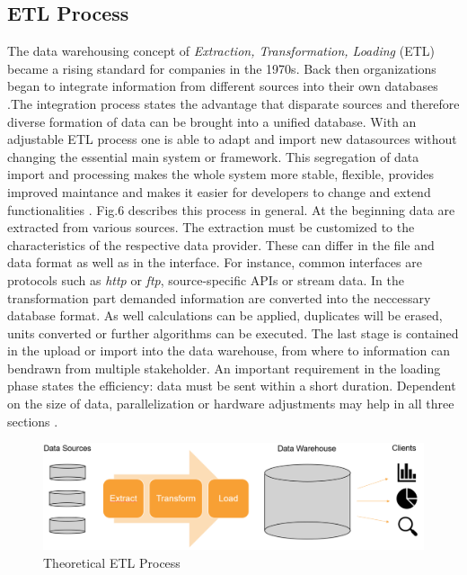 \documentclass[conference, 11pt]{IEEEtran}
\begin{document}
\subsection{ETL Process}
The data warehousing concept of \textit{Extraction, Transformation, Loading} (ETL) became a rising standard for companies in the 1970s. Back then organizations began to integrate information from different sources into their own databases \cite{carl1}.\break The integration process states the advantage that disparate sources and therefore diverse formation of data can be brought into a unified database. With an adjustable ETL process one is able to adapt and import new datasources without 
changing the essential main system or framework. This segregation of data import and processing makes the whole system more stable, flexible, provides improved maintance and makes it easier for developers to change and extend functionalities \cite{carl2}. Fig.6 describes this process in general. At the beginning data are extracted from various sources. The extraction must be customized to the characteristics of the respective data provider. These can differ in the file and data format as well as in the interface. For instance, common interfaces are protocols such as \textit{http} or \textit{ftp}, source-specific APIs or stream data.
In the transformation part demanded information are converted into the neccessary database format. As well calculations can be applied, duplicates will be erased, units converted or further algorithms can be executed. 
The last stage is contained in the upload or import into the data warehouse, from where to information can bendrawn from multiple stakeholder. An important requirement in the loading phase states the efficiency: data must be sent within a short duration. Dependent on the size of data, parallelization or hardware adjustments may help in all three sections \cite{etlRef}. 
\linebreak




\vspace{0.5cm}
\begin{figure}[htbp]
\centerline{\includegraphics[scale=0.3]{Graphics/ETLTheory.PNG}}
\caption{Theoretical ETL Process}
\label{fig}
\end{figure}
\vspace{0.5cm}
\end{document}
